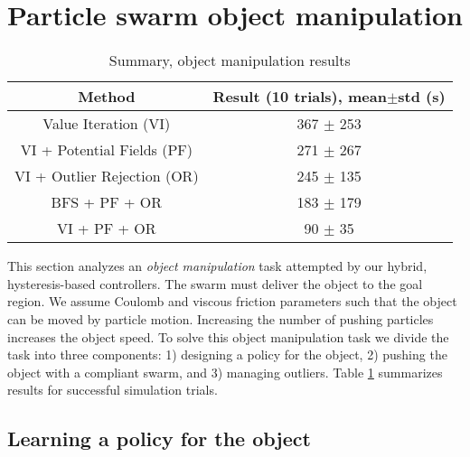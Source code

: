 
\section{Particle swarm object manipulation}\label{sec:exp}
\begin{table}[h!]
  \begin{center}
    \caption{\label{tbl:resultsSum}Summary, object manipulation results}
\begin{tabular}{ c c }
\hline
Method & Result (10 trials), mean$\pm$std (s)\\ [0.5ex] 
\hline \hline
Value Iteration (VI) & 367 $\pm$ 253 \\ 
\hline
VI + Potential Fields (PF) & 271 $\pm$ 267 \\  
\hline
VI + Outlier Rejection (OR) & 245 $\pm$ 135\\
\hline
BFS + PF + OR & 183 $\pm$ 179 \\
\hline
VI + PF + OR & 90 $\pm$ 35 \\[0.5ex]
\hline
\end{tabular}
\end{center}
\end{table}

This section analyzes an \emph{object manipulation} task attempted by our hybrid, hysteresis-based controllers. The swarm must deliver the object to the goal region. 
We assume Coulomb and viscous friction parameters such that the object can be moved by particle motion.  Increasing the number of pushing particles increases the object speed.
 To solve this object manipulation task we divide the task into three components: 1) designing a policy for the object, 2) pushing the object with a compliant swarm, and 3) managing outliers. Table \ref{tbl:resultsSum} summarizes results for successful simulation trials.





\subsection{Learning a policy for the object}\label{subsec:objectpolicy}

